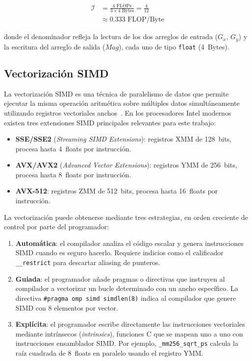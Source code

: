 \begin{equation}
\begin{split}
  \mathcal{I} &= \frac{4 \text{ FLOPs}}{3 \times 4 \text{ Bytes}}
               = \frac{4}{12} \\
              &\approx 0.333 \text{ FLOP/Byte}
\end{split}
  \label{eq:ai}
\end{equation}

donde el denominador refleja la lectura de los dos arreglos de
entrada ($G_x$, $G_y$) y la escritura del arreglo de salida
($\textit{Mag}$), cada uno de tipo \texttt{float} (4~Bytes).

\subsection{Vectorizaci\'on SIMD}

La vectorizaci\'on SIMD es una t\'ecnica de paralelismo de datos
que permite ejecutar la misma operaci\'on aritm\'etica sobre
m\'ultiples datos simult\'aneamente utilizando registros vectoriales
anchos~\cite{reinders2007}.
En los procesadores Intel modernos existen tres extensiones SIMD
principales relevantes para este trabajo:

\begin{itemize}
  \item \textbf{SSE/SSE2} (\textit{Streaming SIMD Extensions}):
    registros XMM de 128~bits, procesa hasta 4~floats por
    instrucci\'on.
  \item \textbf{AVX/AVX2} (\textit{Advanced Vector Extensions}):
    registros YMM de 256~bits, procesa hasta 8~floats por
    instrucci\'on.
  \item \textbf{AVX-512}: registros ZMM de 512~bits, procesa
    hasta 16~floats por instrucci\'on.
\end{itemize}

La vectorizaci\'on puede obtenerse mediante tres estrategias,
en orden creciente de control por parte del programador:

\begin{enumerate}
  \item \textbf{Autom\'atica}: el compilador analiza el c\'odigo
    escalar y genera instrucciones SIMD cuando es seguro hacerlo.
    Requiere indicios como el calificador \texttt{\_\_restrict}
    para descartar aliasing de punteros.

  \item \textbf{Guiada}: el programador a\~nade pragmas o
    directivas que instruyen al compilador a vectorizar un bucle
    determinado con un ancho espec\'ifico.
    La directiva \texttt{\#pragma omp simd simdlen(8)} indica
    al compilador que genere SIMD con 8 elementos por vector.

  \item \textbf{Expl\'icita}: el programador escribe directamente
    las instrucciones vectoriales mediante intr\'insecos
    (\textit{intrinsics}), funciones C que se mapean uno a uno con
    instrucciones ensamblador SIMD.
    Por ejemplo, \texttt{\_mm256\_sqrt\_ps} calcula la ra\'iz
    cuadrada de 8~floats en paralelo usando el registro YMM.
\end{enumerate}

